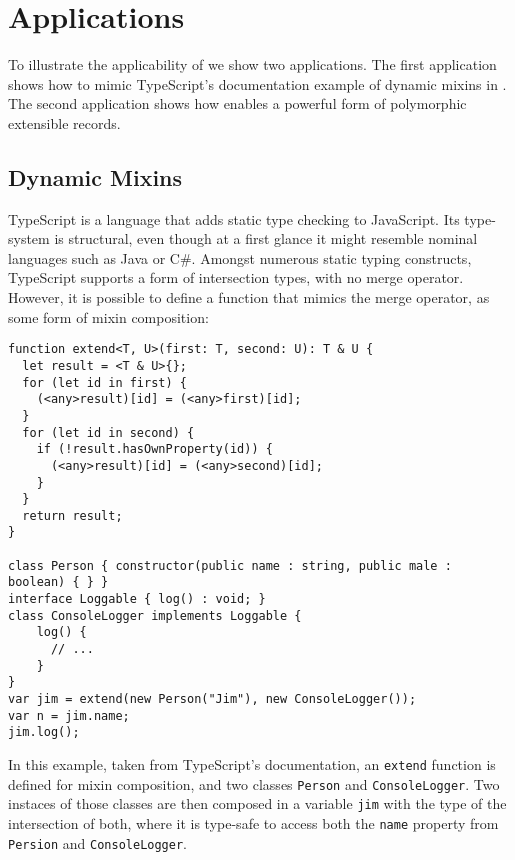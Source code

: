 \section{Applications}
\label{subsec:records}

To illustrate the applicability of \name we show two applications. The
first application shows how to mimic TypeScript's documentation example of 
dynamic mixins in \name. The second application shows how \name
enables a powerful form of polymorphic extensible records.

\subsection{Dynamic Mixins}
TypeScript is a language that adds static type checking to JavaScript.
Its type-system is structural, even though at a first glance it might resemble 
nominal languages such as Java or C\#.
Amongst numerous static typing constructs, TypeScript supports a form of intersection types, 
with no merge operator. 
However, it is possible to define a function 
that mimics the merge operator, as some form of mixin composition:

\begin{lstlisting}
function extend<T, U>(first: T, second: U): T & U {
  let result = <T & U>{};
  for (let id in first) {
    (<any>result)[id] = (<any>first)[id];
  }
  for (let id in second) {
    if (!result.hasOwnProperty(id)) {
      (<any>result)[id] = (<any>second)[id];
    }
  }
  return result;
}

class Person { constructor(public name : string, public male : boolean) { } }
interface Loggable { log() : void; }
class ConsoleLogger implements Loggable {
    log() {
      // ...
    }
}
var jim = extend(new Person("Jim"), new ConsoleLogger());
var n = jim.name;
jim.log();
\end{lstlisting}

In this example, taken from TypeScript's documentation, an \lstinline$extend$ function is defined 
for mixin composition, and two classes \lstinline$Person$ and \lstinline$ConsoleLogger$. 
Two instaces of those classes are then composed in a variable \lstinline$jim$ with the type of 
the intersection of both, where it is type-safe to access both the \lstinline$name$ property
from \lstinline$Persion$ and \lstinline$ConsoleLogger$.

